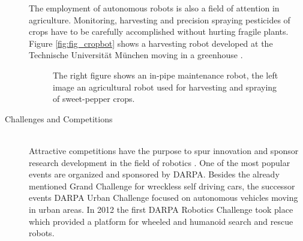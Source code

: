 \begin{description}
The employment of autonomous robots is also a field of attention in agriculture. 
Monitoring, harvesting and precision spraying pesticides of crops have to be carefully accomplished without hurting fragile plants. 
Figure \ref{fig:fig_cropbot} shows a harvesting robot developed at the Technische Universit\"at M\"unchen moving in a greenhouse \cite{Schuetz2014}.

\begin{figure}[thpb]
	  \myfloatalign
      \footnotesize
      \centering
   \caption[Commercial robots]{The right figure shows an in-pipe maintenance robot, the left image an agricultural robot used for harvesting and spraying of sweet-pepper crops.}
   \label{fig:fig_commercial}
\end{figure}

\item[Challenges and Competitions]\hfill \\
Attractive competitions have the purpose to spur innovation and sponsor research development in the field of robotics .  
One of the most popular events are organized and sponsored by DARPA. Besides the already mentioned Grand Challenge for wreckless self driving cars, the successor events DARPA Urban Challenge focused on autonomous vehicles moving in urban areas. 
In 2012 the first DARPA Robotics Challenge took place which provided a platform for wheeled and humanoid search and rescue robots.


\end{description}
